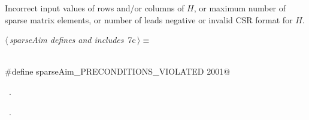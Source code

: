 \documentclass{article}
\begin{document}
\begin{description}
\begin{description}
\begin{flushleft}
\begin{minipage}{\linewidth}
\begin{list}{}{\setlength{\itemsep}{-\parsep}\setlength{\itemindent}{-\leftmargin}}
\item{}
\end{list}
\end{minipage}\vspace{4ex}
\end{flushleft}
\item[{\bf sparseAim\_PRECONDITIONS\_VIOLATED}]
Incorrect input values of rows and/or columns of $H$, or maximum number of 
sparse matrix elements, or number of leads negative or invalid 
CSR format for $H$.
\begin{flushleft} \small
\begin{minipage}{\linewidth}\label{scrap4}\raggedright\small
{} $\langle\,${\itshape sparseAim defines and includes}\nobreak\ {\footnotesize {7c}}$\,\rangle\equiv$
\vspace{-1ex}
\begin{list}{}{} \item
\mbox{}\verb@@\\
\mbox{}\verb@#define sparseAim_PRECONDITIONS_VIOLATED 2001@\\
\mbox{}\verb@@{\NWsep}
\end{list}
\vspace{-1.5ex}
\footnotesize
\begin{list}{}{\setlength{\itemsep}{-\parsep}\setlength{\itemindent}{-\leftmargin}}
\item \NWtxtMacroDefBy\ .
\item \NWtxtMacroRefIn\ .


\end{list}
\end{minipage}
\end{flushleft}
\end{description}
\end{description}
\end{document}
